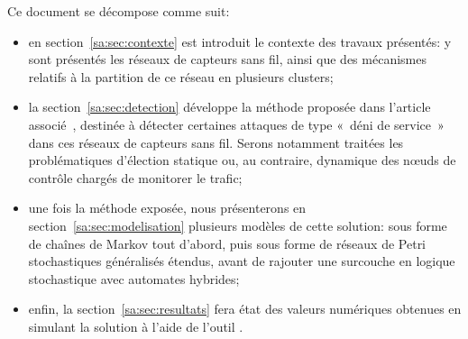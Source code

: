 Ce document se décompose comme suit:
\begin{itemize}
	\item en section~\ref{sa:sec:contexte} est introduit le contexte des travaux présentés: y sont présentés les réseaux de capteurs sans fil, ainsi que des mécanismes relatifs à la partition de ce réseau en plusieurs clusters;
	\item la section~\ref{sa:sec:detection} développe la méthode proposée dans l'article associé~\cite{BMM13}, destinée à détecter certaines attaques de type «~déni de service~» dans ces réseaux de capteurs sans fil. Serons notamment traitées les problématiques d'élection statique ou, au contraire, dynamique des nœuds de contrôle chargés de monitorer le trafic;
	\item une fois la méthode exposée, nous présenterons en section~\ref{sa:sec:modelisation} plusieurs modèles de cette solution: sous forme de chaînes de Markov tout d'abord, puis sous forme de réseaux de Petri stochastiques généralisés étendus, avant de rajouter une surcouche en logique stochastique avec automates hybrides;
	\item enfin, la section~\ref{sa:sec:resultats} fera état des valeurs numériques obtenues en simulant la solution à l'aide de l'outil \ns.
\end{itemize}








